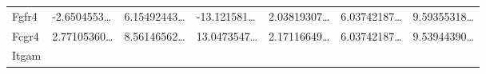 \documentclass[
]{article}
\begin{document}
\begin{longtable}[]{@{}lllllll@{}}
\begin{minipage}[t]{0.08\columnwidth}\raggedright
Fgfr4\strut
\end{minipage} & \begin{minipage}[t]{0.12\columnwidth}\raggedright
-2.6504553\ldots{}\strut
\end{minipage} & \begin{minipage}[t]{0.12\columnwidth}\raggedright
6.15492443\ldots{}\strut
\end{minipage} & \begin{minipage}[t]{0.12\columnwidth}\raggedright
-13.121581\ldots{}\strut
\end{minipage} & \begin{minipage}[t]{0.12\columnwidth}\raggedright
2.03819307\ldots{}\strut
\end{minipage} & \begin{minipage}[t]{0.12\columnwidth}\raggedright
6.03742187\ldots{}\strut
\end{minipage} & \begin{minipage}[t]{0.12\columnwidth}\raggedright
9.59355318\ldots{}\strut
\end{minipage}\tabularnewline
\begin{minipage}[t]{0.08\columnwidth}\raggedright
Fcgr4\strut
\end{minipage} & \begin{minipage}[t]{0.12\columnwidth}\raggedright
2.77105360\ldots{}\strut
\end{minipage} & \begin{minipage}[t]{0.12\columnwidth}\raggedright
8.56146562\ldots{}\strut
\end{minipage} & \begin{minipage}[t]{0.12\columnwidth}\raggedright
13.0473547\ldots{}\strut
\end{minipage} & \begin{minipage}[t]{0.12\columnwidth}\raggedright
2.17116649\ldots{}\strut
\end{minipage} & \begin{minipage}[t]{0.12\columnwidth}\raggedright
6.03742187\ldots{}\strut
\end{minipage} & \begin{minipage}[t]{0.12\columnwidth}\raggedright
9.53944390\ldots{}\strut
\end{minipage}\tabularnewline
\begin{minipage}[t]{0.08\columnwidth}\raggedright
Itgam\strut
\end{minipage} & \begin{minipage}[t]{0.12\columnwidth}\raggedright

\end{minipage}
\end{longtable}
\end{document}
